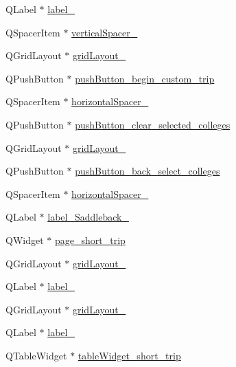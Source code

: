 \begin{DoxyCompactItemize}
\item 
Q\+Label $\ast$ \hyperlink{class_ui___main_window_a9125c3f58951f983d461686ccaabb468}{label\+\_}
\item 
Q\+Spacer\+Item $\ast$ \hyperlink{class_ui___main_window_adc1f5fdd97fb3729999c56902d0fa591}{vertical\+Spacer\+\_}
\item 
Q\+Grid\+Layout $\ast$ \hyperlink{class_ui___main_window_a8ee86315639f324b17708efc7dbe8b19}{grid\+Layout\+\_}
\item 
Q\+Push\+Button $\ast$ \hyperlink{class_ui___main_window_ac2c27fba3446f9b26c7ce21ffc13f919}{push\+Button\+\_\+begin\+\_\+custom\+\_\+trip}
\item 
Q\+Spacer\+Item $\ast$ \hyperlink{class_ui___main_window_a9e350f046ad8631663eedf74f03d1e47}{horizontal\+Spacer\+\_}
\item 
Q\+Push\+Button $\ast$ \hyperlink{class_ui___main_window_a63b5a04d87497371b68cb40080622925}{push\+Button\+\_\+clear\+\_\+selected\+\_\+colleges}
\item 
Q\+Grid\+Layout $\ast$ \hyperlink{class_ui___main_window_a79b264e6945e3b94a511427b1c270dd7}{grid\+Layout\+\_}
\item 
Q\+Push\+Button $\ast$ \hyperlink{class_ui___main_window_aa9b5ba86cde906e08158afb24f4d2beb}{push\+Button\+\_\+back\+\_\+select\+\_\+colleges}
\item 
Q\+Spacer\+Item $\ast$ \hyperlink{class_ui___main_window_abda5a6d186c288668b4cc00732eb158e}{horizontal\+Spacer\+\_}
\item 
Q\+Label $\ast$ \hyperlink{class_ui___main_window_aa981e8262ac9b75166c102116572e850}{label\+\_\+\+Saddleback\+\_}
\item 
Q\+Widget $\ast$ \hyperlink{class_ui___main_window_a0cba4307f06b60e4a93f4b3556fdd777}{page\+\_\+short\+\_\+trip}
\item 
Q\+Grid\+Layout $\ast$ \hyperlink{class_ui___main_window_a4c2d544352d423a361b8ab2e1d5636ec}{grid\+Layout\+\_}
\item 
Q\+Label $\ast$ \hyperlink{class_ui___main_window_ab6ac4329a89041f557332f6569d94493}{label\+\_}
\item 
Q\+Grid\+Layout $\ast$ \hyperlink{class_ui___main_window_af42ea7d4c2e893181caad21e28166932}{grid\+Layout\+\_}
\item 
Q\+Label $\ast$ \hyperlink{class_ui___main_window_a1f4ff90c122fededcc08604401442034}{label\+\_}
\item 
Q\+Table\+Widget $\ast$ \hyperlink{class_ui___main_window_a5949e9c6c20bc1b7db62d1a249e25d81}{table\+Widget\+\_\+short\+\_\+trip}

\end{DoxyCompactItemize}
